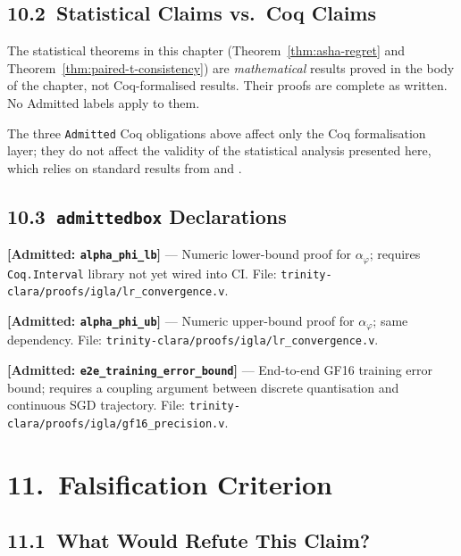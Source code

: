 \subsection{10.2\ Statistical Claims vs.\ Coq Claims}

The statistical theorems in this chapter (Theorem~\ref{thm:asha-regret}
and Theorem~\ref{thm:paired-t-consistency}) are \emph{mathematical}
results proved in the body of the chapter, not Coq-formalised results.
Their proofs are complete as written.  No Admitted labels apply to them.

The three \texttt{Admitted} Coq obligations above affect only the Coq
formalisation layer; they do not affect the validity of the statistical
analysis presented here, which relies on standard results from
\cite{wasserman2004statistics} and \cite{casella2002statistical}.

\subsection{10.3\ \texttt{admittedbox} Declarations}

\renewcommand{\admittedbox}[2]{\noindent\textbf{[Admitted: \texttt{#1}]} --- #2}

\admittedbox{alpha\_phi\_lb}{Numeric lower-bound proof for \(\alpha_\varphi\); requires \texttt{Coq.Interval} library not yet wired into CI. File: \texttt{trinity-clara/proofs/igla/lr\_convergence.v}.}

\admittedbox{alpha\_phi\_ub}{Numeric upper-bound proof for \(\alpha_\varphi\); same dependency. File: \texttt{trinity-clara/proofs/igla/lr\_convergence.v}.}

\admittedbox{e2e\_training\_error\_bound}{End-to-end GF16 training error bound; requires a coupling argument between discrete quantisation and continuous SGD trajectory. File: \texttt{trinity-clara/proofs/igla/gf16\_precision.v}.}

\section{11.\ Falsification Criterion}\label{sec:ch26-falsification}

\subsection{11.1\ What Would Refute This Claim?}

